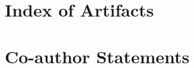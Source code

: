 \chapter{Index of Artifacts}\label{app:sec:artifacts}

\clearpage

\chapter{Co-author Statements}\label{app:sec:coauth}

\clearpage

\pagestyle{plain}
\printglossary[type=\acronymtype,nonumberlist,style=longragged]
\clearpage

\pagestyle{plain}
\printglossary[type=symbols]
\clearpage

\printindex